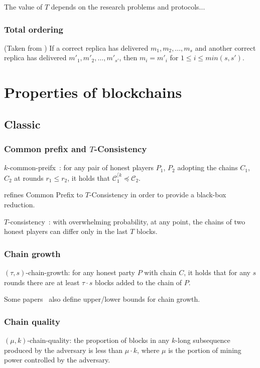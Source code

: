 \documentclass[runningheads]{llncs}
\begin{document}
The value of $T$ depends on the research problems and protocols...

\subsubsection{Total ordering}
(Taken from \cite{duan2018beat}) If a correct replica has delivered $m_1, m_2, \dots ,m_s$ and another correct replica has delivered $m'_1,m'_2, \dots,m'_{s'}$, then $m_i = m'_i$ for $1 \leq i \leq min(s, s')$.





\section{Properties of blockchains}

\subsection{Classic}

\subsubsection{Common prefix and $T$-Consistency}
$k$-common-preifx~\cite{garay2015bitcoin}:
for any pair of honest players $P_1$, $P_2$ adopting the chains $C_1$, $C_2$ at rounds $r_1 \leq r_2$, it holds that $\mathcal{C}_{1}^{\lceil k} \preceq \mathcal{C}_2$.

\cite{pass2017analysis} refines Common Prefix to $T$-Consistency in order to provide a black-box reduction.

$T$-consistency~\cite{pass2017analysis}:
with overwhelming probability, at any point, the chains of two honest players can differ only in the last $T$ blocks.

\subsubsection{Chain growth}
$(\tau, s)$-chain-growth:
for any honest party $P$ with chain $C$, it holds that for any $s$ rounds there are at least $\tau \cdot s$ blocks added to the chain of $P$.

Some papers~\cite{rocket2018snowflake}\cite{pass2017sleepy} also define upper/lower bounds for chain growth.

\subsubsection{Chain quality}
$(\mu, k)$-chain-quality: the proportion of blocks in any $k$-long subsequence produced by the adversary is less than $\mu \cdot k$, where $\mu$ is the portion of mining power controlled by the adversary.






\end{document}
